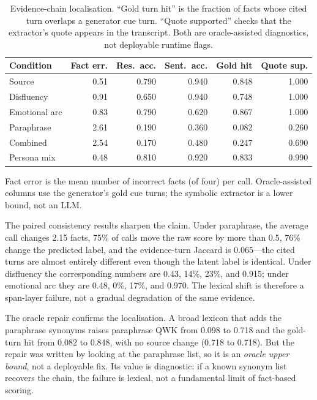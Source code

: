 \documentclass[11pt,a4paper]{article}
\begin{document}
\begin{table}[t]
\centering
\caption{Evidence-chain localisation. ``Gold turn hit'' is the fraction of facts whose cited turn
overlaps a generator cue turn. ``Quote supported'' checks that the extractor's quote appears in
the transcript. Both are oracle-assisted diagnostics, not deployable runtime flags.}
\label{tab:evidence}
\begin{threeparttable}
\small
\begin{tabular}{@{}lrrrrr@{}}
\toprule
Condition & Fact err. & Res.\ acc. & Sent.\ acc. & Gold hit & Quote sup. \\
\midrule
Source & 0.51 & 0.790 & 0.940 & 0.848 & 1.000 \\
Disfluency & 0.91 & 0.650 & 0.940 & 0.748 & 1.000 \\
Emotional arc & 0.83 & 0.790 & 0.620 & 0.867 & 1.000 \\
Paraphrase & 2.61 & 0.190 & 0.360 & 0.082 & 0.260 \\
Combined & 2.54 & 0.170 & 0.480 & 0.247 & 0.690 \\
Persona mix & 0.48 & 0.810 & 0.920 & 0.833 & 0.990 \\
\bottomrule
\end{tabular}
\begin{tablenotes}\footnotesize
\item Fact error is the mean number of incorrect facts (of four) per call. Oracle-assisted
columns use the generator's gold cue turns; the symbolic extractor is a lower bound, not an LLM.
\end{tablenotes}
\end{threeparttable}
\end{table}

The paired consistency results sharpen the claim. Under paraphrase, the average call changes
2.15 facts, 75\% of calls move the raw score by more than 0.5, 76\% change the predicted label,
and the evidence-turn Jaccard is 0.065---the cited turns are almost entirely different even
though the latent label is identical. Under disfluency the corresponding numbers are 0.43,
14\%, 23\%, and 0.915; under emotional arc they are 0.48, 0\%, 17\%, and 0.970. The lexical
shift is therefore a span-layer failure, not a gradual degradation of the same evidence.

The oracle repair confirms the localisation. A broad lexicon that adds the paraphrase synonyms
raises paraphrase QWK from 0.098 to 0.718 and the gold-turn hit from 0.082 to 0.848, with no
source change (0.718 to 0.718). But the repair was written by looking at the paraphrase list, so
it is an \emph{oracle upper bound}, not a deployable fix. Its value is diagnostic: if a known
synonym list recovers the chain, the failure is lexical, not a fundamental limit of fact-based
scoring.
\end{document}
